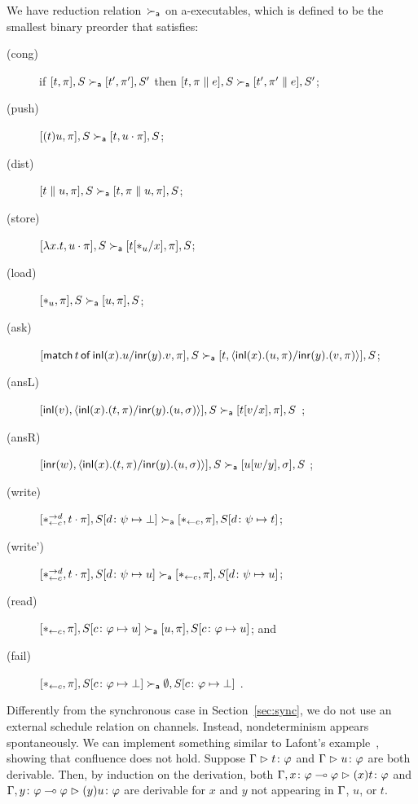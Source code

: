 We have reduction relation~$\ared$ on a-executables,
which is defined to be the smallest binary preorder
that satisfies:
\begin{description}
 \item[(cong)] if
	    $[t,\pi],         S \ared [ t',\pi'],        S'$
	    then
	    $[t,\pi \conc e], S \ared [ t',\pi'\conc e], S'$\enspace;
 \item[(push)]
	    $[(t)u,\pi],S       \ared [t,u\cdot\pi],S$;
 \item[(dist)]
	    $[t\conc u,\pi],S   \ared [t,\pi\conc u,\pi],S$\enspace;
 \item[(store)]
	    $[\lambda x.t,u\cdot\pi],S
	     \ared
	     [t[\ast_u/x],      \pi],S$\enspace;
 \item[(load)]
	    $[\ast_u,\pi],S\ared[u,\pi],S$\enspace;
 \item[(ask)]
      $[\mat t x u y v,\pi], S\ared [t,\mats x u \pi y v \pi], S$\enspace;
 \item[(ansL)]
      $[\inl{v}, \mats xt\pi yu\sigma],S \ared [t[v/x],\pi],S $ \enspace;
 \item[(ansR)]
      $[\inr{w}, \mats xt\pi yu\sigma],S \ared [u[w/y],\sigma],S $ \enspace;
 \item[(write)]
	    $
	    [\comod c{d}, t\cdot\pi], S[d\colon\psi\mapsto\bot]
	    \ared
	    [\reader c, \pi],
	    S[d\colon\psi\mapsto t]
	    $\enspace;
 \item[(write')]
	    $
	    [\comod c{d}, t\cdot\pi], S[d\colon\psi\mapsto u]
	    \ared
	    [\reader c, \pi],
	    S[d\colon\psi\mapsto u]
	    $\enspace;
 \item[(read)]$
	    [\reader c ,\pi],
	    S[c\colon\phi\mapsto u]
	    \ared
	    [u,\pi],
	    S[c\colon\phi\mapsto u]
	    $\enspace; and
 \item[(fail)]
	    $
	    [\reader c,\pi],
	    S[c\colon\phi\mapsto \bot]
	    \ared
	    \emptyset,S[c\colon\phi\mapsto \bot]
	    $
	    \enspace.
\end{description}
Differently from the synchronous case in Section~\ref{sec:sync},
we do not use an external schedule relation on channels.
Instead, nondeterminism appears spontaneously.
We can implement something similar to Lafont's example~\citep[B.1]{girard1989proofs},
showing that confluence does not hold.
Suppose $\G\tr\tj t\phi$ and $\G\tr\tj u\phi$ are both derivable.
Then, by induction on the derivation,
both $\G,\tj x{\phi\limp\phi}\tr\tj{(x)t}\phi$
and $\G,\tj y{\phi\limp\phi}\tr\tj{(y)u}\phi$ are derivable
for $x$ and $y$ not appearing in $\G$, $u$, or $t$.
